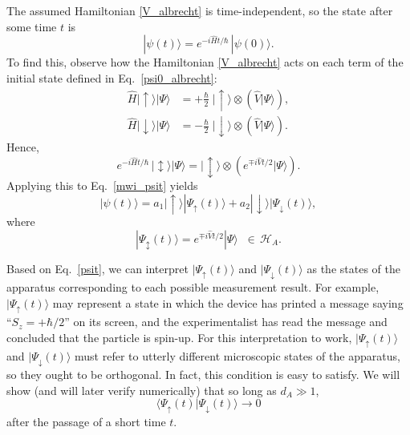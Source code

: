 \documentclass[pra,12pt]{revtex4-2}
\begin{document}
The assumed Hamiltonian \eqref{V_albrecht} is time-independent, so the
state after some time $t$ is
\begin{equation}
  |\psi(t)\rangle = e^{-i\hat{H}t/\hbar}\, |\psi(0)\rangle.
  \label{mwi_psit}
\end{equation}
To find this, observe how the Hamiltonian \eqref{V_albrecht} acts on
each term of the initial state defined in Eq.~\eqref{psi0_albrecht}:
\begin{align}
  \hat{H} |\!\uparrow\rangle |\Psi\rangle
  &= + \frac{\hbar}{2}\;
  |\!\uparrow\rangle \otimes \left(\hat{V} |\Psi\rangle\right), \\
  \hat{H} |\!\downarrow\rangle |\Psi\rangle
  &= - \frac{\hbar}{2}\;
  |\!\downarrow\rangle \otimes \left( \hat{V} |\Psi\rangle\right).
\end{align}
Hence,
\begin{equation}
  e^{-i\hat{H}t/\hbar}\, 
  |\!\updownarrow\rangle |\Psi\rangle
  = |\!\updownarrow\rangle \otimes
  \left(e^{\mp i\hat{V}t/2} |\Psi\rangle\right).
\end{equation}
Applying this to Eq.~\eqref{mwi_psit} yields
\begin{equation}
  |\psi(t)\rangle =
  a_1 |\!\uparrow\rangle |\Psi_\uparrow(t)\rangle + a_2 |\!\downarrow\rangle  |\Psi_\downarrow(t)\rangle,
  \label{psit}
\end{equation}
where
\begin{equation}
  |\Psi_{\updownarrow} (t)\rangle = e^{\mp i\hat{V}t/2} |\Psi\rangle
  \;\;\in\, \mathscr{H}_A.
\end{equation}

Based on Eq.~\eqref{psit}, we can interpret $|\Psi_\uparrow(t)\rangle$
and $|\Psi_\downarrow(t)\rangle$ as the states of the apparatus
corresponding to each possible measurement result.  For example,
$|\Psi_\uparrow(t)\rangle$ may represent a state in which the device
has printed a message saying ``$S_z = + \hbar/2$'' on its screen, and
the experimentalist has read the message and concluded that the
particle is spin-up.  For this interpretation to work,
$|\Psi_\uparrow(t)\rangle$ and $|\Psi_\downarrow(t)\rangle$ must refer
to utterly different microscopic states of the apparatus, so they
ought to be orthogonal.  In fact, this condition is easy to satisfy.
We will show (and will later verify numerically) that so long as $d_A
\gg 1$,
\begin{equation}
  \langle\Psi_\uparrow(t) | \Psi_\downarrow(t)\rangle \rightarrow 0
  \label{overlapzero}
\end{equation}
after the passage of a short time $t$.
\end{document}
